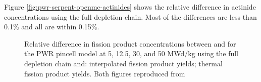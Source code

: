 Figure \ref{fig:pwr-serpent-openmc-actinides} shows the relative difference in
actinide concentrations using the full depletion chain. Most of the differences
are less than 0.1\% and all are within 0.15\%.  

\begin{figure}[htpb]
    \centering
    \caption[Relative difference in fission product concentrations between
    OpenMC and Serpent for the PWR pincell model]{Relative difference in fission
    product concentrations between \OpenMC and \SerpentTWO for the PWR pincell model
    at 5, 12.5, 30, and 50 MWd/kg using the full depletion chain and:
     interpolated fission product yields;
     thermal fission product yields.
    Both figures reproduced from \cite{romano_depletion_2021}}
    \label{fig:pwr-serpent-openmc-fp}
\end{figure}

